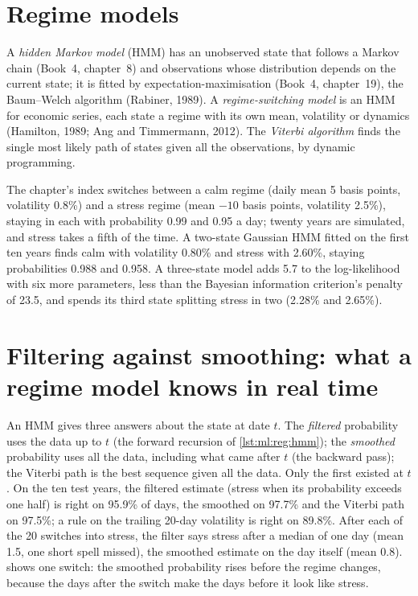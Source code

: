 \section{Regime models}

\begin{definition}\label{def:ml:clustering-regimes-and-anomaly-detection:hmm}
A \emph{hidden Markov model} (HMM) has an unobserved state that follows a Markov chain (Book~4,
chapter~8) and observations whose distribution depends on the current state; it is fitted by expectation-maximisation (Book~4,
chapter~19), the Baum--Welch algorithm (Rabiner, 1989). A \emph{regime-switching model} is an HMM
for economic series, each state a regime with its own mean, volatility or dynamics (Hamilton, 1989; Ang and Timmermann, 2012).
The \emph{Viterbi algorithm} finds the single most likely path of states given all the observations,
by dynamic programming.
\end{definition}

The chapter's index switches between a calm regime (daily mean 5 basis points, volatility 0.8\%) and a stress regime (mean
$-10$ basis points, volatility 2.5\%), staying in each with probability 0.99 and 0.95 a day; twenty years are simulated, and
stress takes a fifth of the time. A two-state Gaussian HMM fitted on the first ten years finds calm with volatility 0.80\% and
stress with 2.60\%, staying probabilities 0.988 and 0.958. A three-state model adds 5.7 to the log-likelihood with six more
parameters, less than the Bayesian information criterion's penalty of 23.5, and spends its third state splitting stress in two
(2.28\% and 2.65\%).

\section{Filtering against smoothing: what a regime model knows in real time}

An HMM gives three answers about the state at date $t$. The \emph{filtered} probability uses the data up to $t$ (the forward
recursion of \cref{lst:ml:reg:hmm}); the \emph{smoothed} probability uses all the data, including what came after $t$ (the
backward pass); the Viterbi path is the best sequence given all the data. Only the first existed at $t$. On the ten test years,
the filtered estimate (stress when its probability exceeds one half) is right on 95.9\% of days, the smoothed on 97.7\% and the
Viterbi path on 97.5\%; a rule on the trailing 20-day volatility is right on 89.8\%. After each of the 20 switches into stress,
the filter says stress after a median of one day (mean 1.5, one short spell missed), the smoothed estimate on the day itself
(mean 0.8).  shows one switch: the smoothed probability rises before the regime changes, because the
days after the switch make the days before it look like stress.

